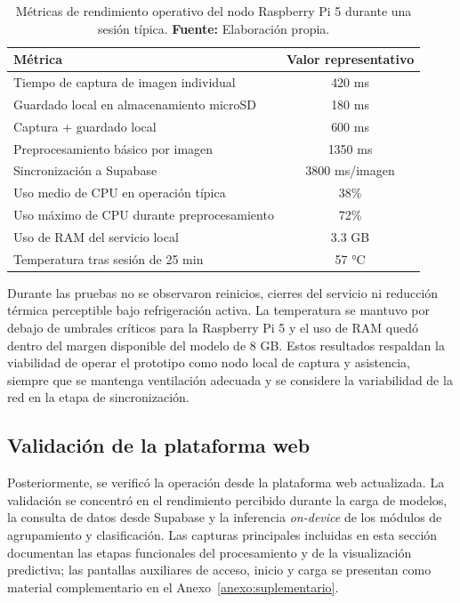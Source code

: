 \begin{table}[H]
\centering
\caption{Métricas de rendimiento operativo del nodo Raspberry Pi 5 durante una sesión típica. \textbf{Fuente:} Elaboración propia.}
\label{tab:metricas-raspberry-operacion}
{\uniformtablestyle
\begin{tabular}{lc}
\toprule
\textbf{Métrica} & \textbf{Valor representativo} \\
\midrule
Tiempo de captura de imagen individual & 420 ms \\
Guardado local en almacenamiento microSD & 180 ms \\
Captura + guardado local & 600 ms \\
Preprocesamiento básico por imagen & 1350 ms \\
Sincronización a Supabase & 3800 ms/imagen \\
Uso medio de CPU en operación típica & 38\% \\
Uso máximo de CPU durante preprocesamiento & 72\% \\
Uso de RAM del servicio local & 3.3 GB \\
Temperatura tras sesión de 25 min & 57 °C \\
\bottomrule
\end{tabular}
}
\end{table}

Durante las pruebas no se observaron reinicios, cierres del servicio ni
reducción térmica perceptible bajo refrigeración activa. La temperatura se
mantuvo por debajo de umbrales críticos para la Raspberry Pi 5 y el uso de RAM
quedó dentro del margen disponible del modelo de 8 GB. Estos resultados respaldan
la viabilidad de operar el prototipo como nodo local de captura y asistencia,
siempre que se mantenga ventilación adecuada y se considere la variabilidad de la
red en la etapa de sincronización.

\subsection{Validación de la plataforma web}

Posteriormente, se verificó la operación desde la plataforma web actualizada. La
validación se concentró en el rendimiento percibido durante la carga de modelos,
la consulta de datos desde Supabase y la inferencia \textit{on-device} de los
módulos de agrupamiento y clasificación. Las capturas principales incluidas en
esta sección documentan las etapas funcionales del procesamiento y de la
visualización predictiva; las pantallas auxiliares de acceso, inicio y carga se
presentan como material complementario en el Anexo~\ref{anexo:suplementario}.


